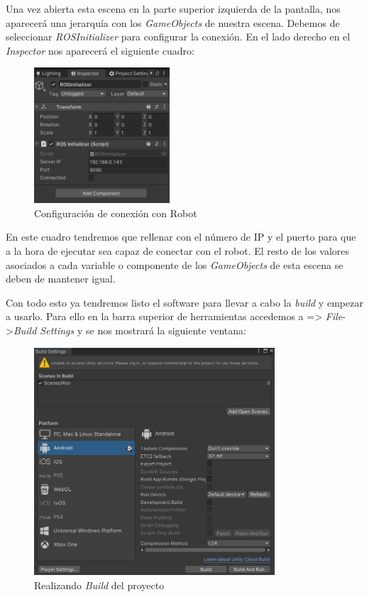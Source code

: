 Una vez abierta esta escena en la parte superior izquierda de la pantalla, nos aparecerá una jerarquía con los \textit{GameObjects}\cite{GameObjects} de nuestra escena. Debemos de seleccionar \textit{ROSInitializer} para configurar la conexión. En el lado derecho en el \textit{Inspector} nos aparecerá el siguiente cuadro: 

   \begin{figure}[h]
\centering
\label{Configuración de conexión con Robot}
\includegraphics[width=0.45\textwidth]{img/inst2.PNG}
\caption{Configuración de conexión con Robot}
\end{figure}

En este cuadro tendremos que rellenar con el número de IP y el puerto para que a la hora de ejecutar sea capaz de conectar con el robot. El resto de los valores asociados a cada variable o componente de los \textit{GameObjects} de esta escena se deben de mantener igual.

Con todo esto ya tendremos listo el software para llevar a cabo la \textit{build} y empezar a usarlo.
Para ello en la barra superior de herramientas accedemos a => \textit{File}->\textit{Build Settings} y se nos mostrará la siguiente ventana:

   \begin{figure}[h]
\centering
\label{Realizando \textit{Build} del proyecto}
\includegraphics[width=0.8\textwidth]{img/inst3.PNG}
\caption{Realizando \textit{Build} del proyecto}
\end{figure}

